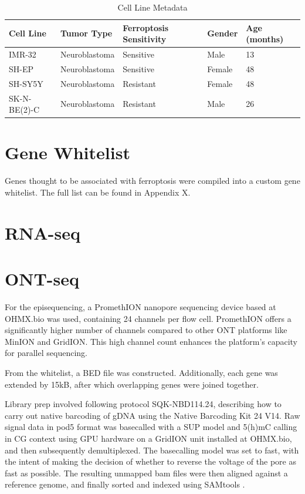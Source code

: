 \begin{table}[!ht]
    \centering
    \begin{adjustbox}{width=\textwidth}
    \begin{tabular}{|l|l|l|l|l|}
    \hline
        \bfseries Cell Line & \bfseries Tumor Type & \bfseries Ferroptosis Sensitivity & \bfseries Gender & \bfseries Age (months) \\ \hline
        IMR-32 & Neuroblastoma & Sensitive & Male & 13 \\ \hline
        SH-EP & Neuroblastoma & Sensitive & Female & 48 \\ \hline
        SH-SY5Y & Neuroblastoma & Resistant & Female & 48 \\ \hline
        SK-N-BE(2)-C & Neuroblastoma & Resistant & Male & 26 \\ \hline
    \end{tabular}
    \end{adjustbox}
    \caption{Cell Line Metadata}
    \label{tab:cellline_meta}
\end{table}

\section{Gene Whitelist}

Genes thought to be associated with ferroptosis were compiled into a custom gene whitelist. The full list can be found in Appendix X.

\section{RNA-seq}



\section{ONT-seq}

For the episequencing, a PromethION nanopore sequencing device based at OHMX.bio was used, containing 24 channels per flow cell. PromethION offers a significantly higher number of channels compared to other ONT platforms like MinION and GridION. This high channel count enhances the platform's capacity for parallel sequencing.

From the whitelist, a BED file was constructed. Additionally, each gene was extended by 15kB, after which overlapping genes were joined together.

Library prep involved following protocol SQK-NBD114.24, describing how to carry out native barcoding of \ac{gDNA} using the Native Barcoding Kit 24 V14. Raw signal data in pod5 format was basecalled with a SUP model and 5(h)mC calling in CG context using GPU hardware on a GridION unit installed at OHMX.bio, and then subsequently demultiplexed. The basecalling model was set to fast, with the intent of making the decision of whether to reverse the voltage of the pore as fast as possible. The resulting unmapped bam files were then aligned against a reference genome, and finally sorted and indexed using SAMtools \citep{samtools}.

